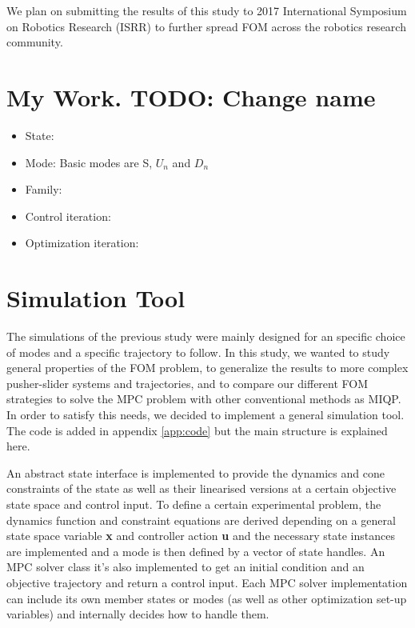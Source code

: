 \documentclass[12,twoside]{TFG-GM}
\theoremstyle{definition}
\theoremstyle{remark}
\begin{document}
We plan on submitting the results of this study to 2017 International Symposium on Robotics Research (ISRR) to further spread FOM across the robotics research community.


\section{My Work. TODO: Change name}
\label{sec:work}


\begin{itemize}
\item {State:}
\item {Mode:} Basic modes are S, $U_n$ and $D_n$
\item {Family:}
\item {Control iteration:}
\item {Optimization iteration:}
\end{itemize}


\section{Simulation Tool}
\label{sec:sim}

The simulations of the previous study were mainly designed for an specific choice of modes and a specific trajectory to follow. In this study, we wanted to study general properties of the FOM problem, to generalize the results to more complex pusher-slider systems and trajectories, and to compare our different FOM strategies to solve the MPC problem with other conventional methods as MIQP. In order to satisfy this needs, we decided to implement a general simulation tool. The code is added in appendix \ref{app:code} but the main structure is explained here.

An abstract state interface is implemented to provide the dynamics and cone constraints of the state as well as their linearised versions at a certain objective state space and control input. To define a certain experimental problem, the dynamics function and constraint equations are derived depending on a general state space variable \textbf{x} and controller action \textbf{u} and the necessary state instances are implemented and a mode is then defined by a vector of state handles. An MPC solver class it's also implemented to get an initial condition and an objective trajectory and return a control input. Each MPC solver implementation can include its own member states or modes (as well as other optimization set-up variables) and internally decides how to handle them.
\end{document}
